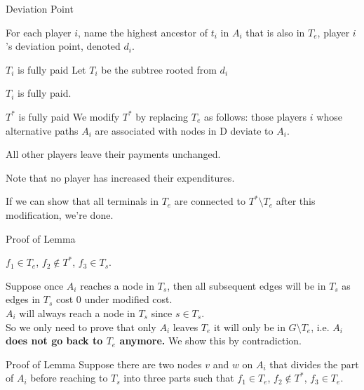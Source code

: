 \documentclass[11pt,aspectratio=169]{beamer}
\begin{document}
\begin{frame}{Deviation Point}
    \begin{definition}
        For each player $i$, name the highest ancestor of $t_i$ in $A_i$ that is also in $T_e$, player $i$'s deviation point, denoted $d_i$.
    \end{definition}
\end{frame}

\begin{frame}{$T_i$ is fully paid}
Let $T_i$ be the subtree rooted from $d_i$
\begin{fact}
    $T_i$ is fully paid.
\end{fact}
\end{frame}


\begin{frame}{$T^*$ is fully paid}
    We modify $T^*$ by replacing $T_e$ as follows: 
those players $i$ whose alternative paths $A_i$ are associated with nodes in D deviate to $A_i$.

All other players leave their payments unchanged.

Note that no player has increased their expenditures.

If we can show that all terminals in $T_e$ are connected
to $T^*\setminus T_e$ after this modification, we're done.
\end{frame}

\begin{frame}{Proof of Lemma}
    \begin{lemma}
        \(f_1 \in T_e\), \(f_2 \notin T^*\), \(f_3 \in T_s\).
    \end{lemma}
    \vspace{10pt}

    Suppose once $A_i$ reaches a node in $T_s$, then all subsequent edges will be in $T_s$ as edges in $T_s$ cost 0 under modified cost. \\
    \vspace{10pt}
    $A_i$ will always reach a node in $T_s$ since $s \in T_s$.\\
    \vspace{10pt}
    So we only need to prove that only $A_i$ leaves $T_e$ it will only be in $G\setminus T_e$, i.e. \textbf{$A_i$ does not go back to $T_e$ anymore.} We show this by contradiction. 
\end{frame}

\begin{frame}{Proof of Lemma}
    Suppose there are two nodes \(v\) and \(w\) on \(A_i\) that divides the part of $A_i$ before reaching to $T_s$ into three parts such that \(f_1 \in T_e\), \(f_2 \notin T^*\), \(f_3 \in T_e\).\\
    \vspace{10pt}
\end{frame}
\end{document}
